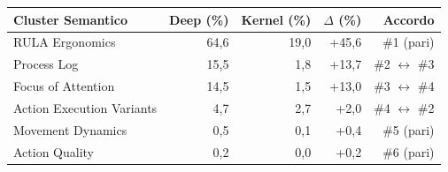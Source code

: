 \begin{tabular*}{\linewidth}{@{}l@{\extracolsep{\fill}}rrrr@{}}
\toprule
\textbf{Cluster Semantico} & \textbf{Deep (\%)} & \textbf{Kernel (\%)} & \textbf{$\Delta$ (\%)} & \textbf{Accordo} \\
\midrule
RULA Ergonomics & 64{,}6 & 19{,}0 & +45{,}6 & \#1 (pari) \\
Process Log & 15{,}5 & 1{,}8 & +13{,}7 & \#2 $\leftrightarrow$ \#3 \\
Focus of Attention & 14{,}5 & 1{,}5 & +13{,}0 & \#3 $\leftrightarrow$ \#4 \\
Action Execution Variants & 4{,}7 & 2{,}7 & +2{,}0 & \#4 $\leftrightarrow$ \#2 \\
Movement Dynamics & 0{,}5 & 0{,}1 & +0{,}4 & \#5 (pari) \\
Action Quality & 0{,}2 & 0{,}0 & +0{,}2 & \#6 (pari) \\
\bottomrule
\end{tabular*}
